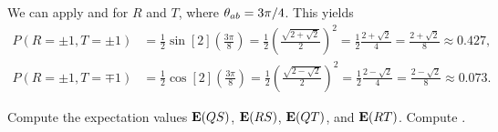 \begin{solution}
	We can apply  and  for $R$ and $T$, where $\theta_{ab} = 3\pi / 4$.  This yields
	\begin{align*}
		P(R=\pm1, T=\pm1) &= \frac{1}{2} \sin[2](\frac{3\pi}{8})
		= \frac{1}{2} \left( \frac{\sqrt{2 + \sqrt{2}}}{2} \right)^2
		= \frac{1}{2} \frac{2 + \sqrt{2}}{4}
		= \frac{2 + \sqrt{2}}{8}
		\approx 0.427, \\
		P(R=\pm1, T=\mp1) &= \frac{1}{2} \cos[2](\frac{3\pi}{8})
		= \frac{1}{2} \left( \frac{\sqrt{2 - \sqrt{2}}}{2} \right)^2
		= \frac{1}{2} \frac{2 - \sqrt{2}}{4}
		= \frac{2 - \sqrt{2}}{8}
		\approx 0.073.
	\end{align*}
	\vfix
\end{solution}



\begin{problem}
	Compute the expectation values $\vb{E}(QS)$, $\vb{E}(RS)$, $\vb{E}(QT)$, and $\vb{E}(RT)$.  Compute
	\beq
		.
	\eeq
	\vfix
\end{problem}


